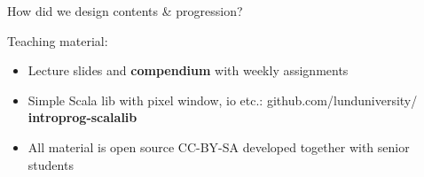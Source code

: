 \documentclass[aspectratio=169]{beamer}
\newenvironment{Slide}[1]%
  {\begin{frame}[environment=Slide]{#1}}
  {\end{frame}}%
\begin{document}
\begin{Slide}{How did we design contents \& progression?}
\begin{minipage}{0.55\textwidth}
  \end{minipage}%
    \begin{minipage}{0.31\textwidth}
      {\hspace{0.5em} Teaching material:}
      \begin{itemize}
        \item Lecture slides and \textbf{compendium} with weekly assignments %
        \item Simple Scala lib with pixel window, io etc.: {github.com/lunduniversity/\\\textbf{introprog-scalalib}}
        \item All material is open source {\footnotesize CC-BY-SA} developed  together with senior students
      \end{itemize}
    \end{minipage}%
  \end{Slide}
\end{document}
